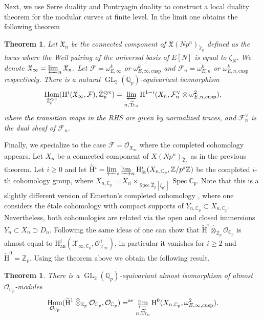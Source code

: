 \documentclass[JEP,XML,SOM,Unicode,published]{cedram}
\newcommand{\rae}{\mathrm{ae}}
\newcommand{\an}{\mathrm{an}}
\newcommand{\cusp}{\mathrm{cusp}}
\newcommand{\cyc}{\mathrm{cyc}}
\newcommand{\et}{\mathrm{\acute{e}t}}
\newcommand{\wotimes}{\mathbin{\widehat\otimes}}
\numberwithin{equation}{section}
\newtheorem{theo}[prop]{Theorem}
\theoremstyle{definition}
\newcommand{\bb}[1]{\mathbb{#1}}
\newcommand{\n}[1]{\mathcal{#1}}
\newcommand{\f}[1]{\mathfrak{#1}}
\newcommand{\s}[1]{\mathscr{#1}}
\DeclareMathOperator{\GL}{GL}
\DeclareMathOperator{\Tr}{Tr}
\DeclareMathOperator{\Hom}{Hom}
\DeclareMathOperator{\Spec}{Spec}
\begin{document}
Next, we use Serre duality and Pontryagin duality to construct a local duality theorem for the modular curves at finite level. In the limit one obtains the following theorem
\begin{theo}
\label{Theo3Intro}
Let $\f{X}_n$ be the connected component of $\f{X}(Np^n)_{\breve{\bb{Z}}_p}$ defined as the locus where the Weil pairing of the universal basis of $E[N]$ is equal to $\zeta_{N}$. We denote $\f{X}_{\infty}= \varprojlim_n \f{X}_n$. Let $\n{F}= \omega^k_{E,\infty}$ or $\omega^k_{E,\infty, \cusp}$ and $\n{F}_n= \omega^k_{E,n}$ or $\omega^k_{E,n,\cusp}$ respectively. There is a natural $\GL_2(\bb{Q}_p)$-equivariant isomorphism
\[
\Hom_{\breve{\bb{Z}}_p^{\cyc} }(\mathrm{H}^i(\f{X}_{\infty}, \n{F}), \breve{\bb{Z}}_p^{\cyc}) = \varprojlim_{n, \widetilde{\Tr}_n} \mathrm{H}^{1-i}(X_n, \n{F}^\vee_n \otimes \omega^2_{E,n,\cusp}),
\]
where the transition maps in the RHS are given by normalized traces, and $\n{F}_n^\vee$ is the dual sheaf of $\n{F}_n$.
\end{theo}
Finally, we specialize to the case $\n{F}= \s{O}_{\f{X}_{\infty}}$ where the completed cohomology appears. Let $X_n$ be a connected component of $X(Np^n)_{\breve{\bb{Z}}_p}$ as in the previous theorem. Let $i\geq 0$ and let $\widetilde{\mathrm{H}}^i= \varprojlim_s \varinjlim_n \mathrm{H}^i_{\et}(X_{n,\bb{C}_p}, \bb{Z}/p^s \bb{Z})$ be the completed $i$-th cohomology group, where $X_{n,\bb{C}_p}= X_n\times_{\Spec \breve{\bb{Z}}_p[\zeta_{p^n}] }\Spec \bb{C}_p$. Note that this is a slightly different version of Emerton's completed cohomology \cite{MR2207783}, where one considers the étale cohomology with compact supports of $Y_{n,\bb{C}_p}\subset X_{n,\bb{C}_p}$. Nevertheless, both cohomologies are related via the open and closed immersions $Y_n \subset X_n \supset D_n$. Following the same ideas of \cite[\S 4.2]{scholzeTorsCoho2015} one can show that $\widetilde{\mathrm{H}}^i\wotimes_{\bb{Z}_p} \n{O}_{\bb{C}_p}$ is almost equal to $\mathrm{H}^i_{\an}(\n{X}_{\infty, \bb{C}_p}, \s{O}^+_{\n{X}_{\infty}})$, in particular it vanishes for $i\geq 2$ and $\widetilde{\mathrm{H}}^0= \bb{Z}_p$. Using the theorem above we obtain the following result.

\begin{theo}
\label{Theo4Intro}
There is a $\GL_2(\bb{Q}_p)$-equivariant almost isomorphism of almost $\n{O}_{\bb{C}_p}$\nobreakdash-modules
\[
\Hom_{\n{O}_{\bb{C}_p}}(\widetilde{\mathrm{H}}^1\wotimes_{\bb{Z}_p} \n{O}_{\bb{C}_p}, \n{O}_{\bb{C}_p})=^{\rae} \varprojlim_{n, \widetilde{\Tr}_n} \mathrm{H}^0(X_{n,\bb{C}_p}, \omega^2_{E,\infty,\cusp}).
\]
\end{theo}
\end{document}
